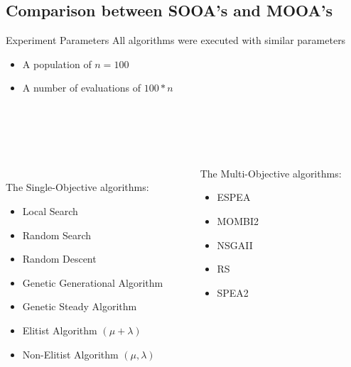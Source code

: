 \documentclass{beamer}
\begin{document}
    \subsection{Comparison between SOOA's and MOOA's}
       \begin{frame}{Experiment Parameters}
        All algorithms were executed with similar parameters
        \begin{itemize}
            \item A population of $n = 100$ %
            \item A number of evaluations of $100*n$ %
        \end{itemize}\\
        \\
        \\
        \begin{columns}
                \begin{column}{0.50\textwidth}
                    \\
                    The Single-Objective algorithms:
                    \begin{itemize}
                        \item Local Search %
                        \item Random Search
                        \item Random Descent %
                        \item Genetic Generational Algorithm
                        \item Genetic Steady Algorithm 
                        \item Elitist Algorithm $(\mu+\lambda)$ 
                        \item Non-Elitist Algorithm $(\mu,\lambda)$
                    \end{itemize}
                \end{column}
                \begin{column}{0.50\textwidth}
                    The Multi-Objective algorithms:
                    \begin{itemize}
                        \item ESPEA 
                        \item MOMBI2
                        \item NSGAII
                        \item RS    
                        \item SPEA2 
                    \end{itemize}
                \end{column}
            \end{columns}\\
    \end{frame}
    
\end{document}
